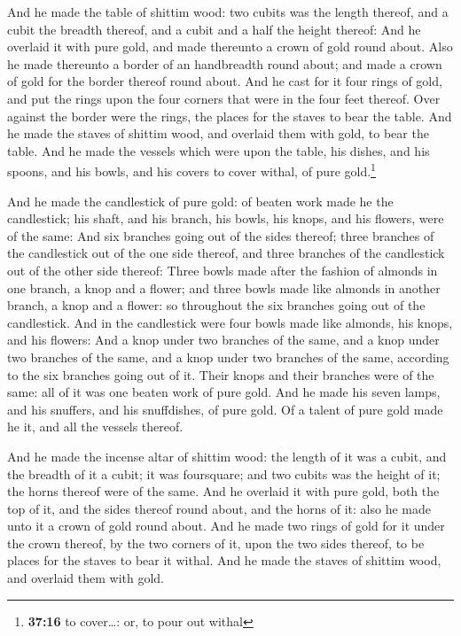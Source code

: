  And he made the table of shittim wood: two cubits was
the length thereof, and a cubit the breadth thereof, and a cubit and a
half the height thereof:  And he overlaid it with pure
gold, and made thereunto a crown of gold round about. 
Also he made thereunto a border of an handbreadth round about; and made
a crown of gold for the border thereof round about.  And
he cast for it four rings of gold, and put the rings upon the four
corners that were in the four feet thereof.  Over against
the border were the rings, the places for the staves to bear the table.
 And he made the staves of shittim wood, and overlaid
them with gold, to bear the table.  And he made the
vessels which were upon the table, his dishes, and his spoons, and his
bowls, and his covers to cover withal, of pure gold.\footnote{\textbf{37:16}
  to cover\ldots: or, to pour out withal}

 And he made the candlestick of pure gold: of beaten work
made he the candlestick; his shaft, and his branch, his bowls, his
knops, and his flowers, were of the same:  And six
branches going out of the sides thereof; three branches of the
candlestick out of the one side thereof, and three branches of the
candlestick out of the other side thereof:  Three bowls
made after the fashion of almonds in one branch, a knop and a flower;
and three bowls made like almonds in another branch, a knop and a
flower: so throughout the six branches going out of the candlestick.
 And in the candlestick were four bowls made like
almonds, his knops, and his flowers:  And a knop under
two branches of the same, and a knop under two branches of the same, and
a knop under two branches of the same, according to the six branches
going out of it.  Their knops and their branches were of
the same: all of it was one beaten work of pure gold. 
And he made his seven lamps, and his snuffers, and his snuffdishes, of
pure gold.  Of a talent of pure gold made he it, and all
the vessels thereof.

 And he made the incense altar of shittim wood: the
length of it was a cubit, and the breadth of it a cubit; it was
foursquare; and two cubits was the height of it; the horns thereof were
of the same.  And he overlaid it with pure gold, both the
top of it, and the sides thereof round about, and the horns of it: also
he made unto it a crown of gold round about.  And he made
two rings of gold for it under the crown thereof, by the two corners of
it, upon the two sides thereof, to be places for the staves to bear it
withal.  And he made the staves of shittim wood, and
overlaid them with gold.

